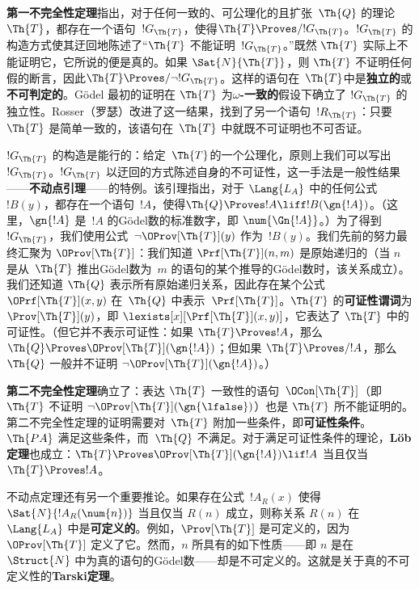 \textbf{第一不完全性定理}指出，对于任何一致的、可公理化的且扩张~$\Th{Q}$ 的理论~$\Th{T}$，都存在一个语句~$!G_\Th{T}$，使得$\Th{T} \Proves/
!G_\Th{T}$。$!G_\Th{T}$ 的构造方式使其迂回地陈述了“$\Th{T}$ 不能证明~$!G_\Th{T}$。”既然 $\Th{T}$ 实际上不能证明它，它所说的便是真的。如果 $\Sat{N}{\Th{T}}$，则 $\Th{T}$ 不证明任何假的断言，因此$\Th{T} \Proves/ \lnot !G_\Th{T}$。这样的语句在~$\Th{T}$中是\textbf{独立的}或\textbf{不可判定的}。Gödel 最初的证明在 $\Th{T}$ 为\textbf{$\omega$-一致的}假设下确立了 $!G_\Th{T}$ 的独立性。Rosser（罗瑟）改进了这一结果，找到了另一个语句~$!R_\Th{T}$：只要 $\Th{T}$ 是简单一致的，该语句在~$\Th{T}$ 中就既不可证明也不可否证。

$!G_\Th{T}$ 的构造是能行的：给定~$\Th{T}$的一个公理化，原则上我们可以写出~$!G_\Th{T}$。$!G_\Th{T}$ 以迂回的方式陈述自身的不可证性，这一手法是一般性结果——\textbf{不动点引理}——的特例。该引理指出，对于 $\Lang{L_A}$ 中的任何公式~$!B(y)$，都存在一个语句~$!A$，使得$\Th{Q} \Proves !A \liff
!B(\gn{!A})$。（这里，$\gn{!A}$ 是~$!A$ 的Gödel数的标准数字，即 $\num{\Gn{!A}}$。）为了得到 $!G_\Th{T}$，我们使用公式~$\lnot\OProv[\Th{T}](y)$ 作为~$!B(y)$。我们先前的努力最终汇聚为 $\OProv[\Th{T}]$：我们知道 $\Prf[\Th{T}](n, m)$ 是原始递归的（当 $n$ 是从~$\Th{T}$ 推出Gödel数为~$m$ 的语句的某个推导的Gödel数时，该关系成立）。我们还知道 $\Th{Q}$ 表示所有原始递归关系，因此存在某个公式 $\OPrf[\Th{T}](x,y)$ 在~$\Th{Q}$ 中表示~$\Prf[\Th{T}]$。$\Th{T}$ 的\textbf{可证性谓词}为 $\Prov[\Th{T}](y)$，即 $\lexists[x][\Prf[\Th{T}](x, y)]$，它表达了 $\Th{T}$ 中的可证性。（但它并不表示可证性：如果 $\Th{T} \Proves !A$，那么 $\Th{Q} \Proves \OProv[\Th{T}](\gn{!A})$；但如果 $\Th{T} \Proves/ !A$，那么 $\Th{Q}$ 一般并不证明 $\lnot
\OProv[\Th{T}](\gn{!A})$。）

\textbf{第二不完全性定理}确立了：表达 $\Th{T}$ 一致性的语句~$\OCon[\Th{T}]$（即 $\Th{T}$ 不证明 $\lnot
\OProv[\Th{T}](\gn{\lfalse})$）也是 $\Th{T}$ 所不能证明的。第二不完全性定理的证明需要对~$\Th{T}$ 附加一些条件，即\textbf{可证性条件}。$\Th{PA}$ 满足这些条件，而~$\Th{Q}$ 不满足。对于满足可证性条件的理论，\textbf{Löb定理}也成立：$\Th{T} \Proves
\OProv[\Th{T}](\gn{!A}) \lif !A$ 当且仅当 $\Th{T} \Proves !A$。

不动点定理还有另一个重要推论。如果存在公式~$!A_R(x)$ 使得 $\Sat{N}{!A_R(\num{n})}$ 当且仅当 $R(n)$ 成立，则称关系 $R(n)$ 在 $\Lang{L_A}$ 中是\textbf{可定义的}。例如，$\Prov[\Th{T}]$ 是可定义的，因为 $\OProv[\Th{T}]$ 定义了它。然而，$n$ 所具有的如下性质——即 $n$ 是在~$\Struct{N}$ 中为真的语句的Gödel数——却是不可定义的。这就是关于真的不可定义性的\textbf{Tarski定理}。